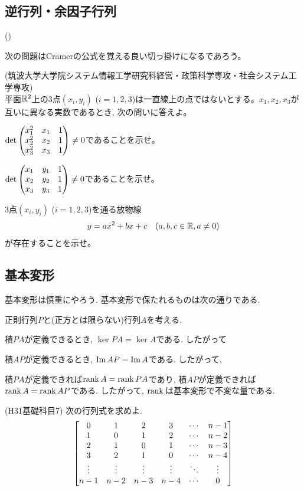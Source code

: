 \subsection{逆行列・余因子行列}

\begin{prop} ()

\end{prop}
次の問題はCramerの公式を覚える良い切っ掛けになるであろう。
\begin{prob}(筑波大学大学院システム情報工学研究科経営・政策科学専攻・社会システム工学専攻)\\
平面$\mathbb{R}^2$上の3点$(x_i,y_i)$ ($i=1,2,3$)は一直線上の点ではないとする。$x_1,x_2,x_3$が互いに異なる実数であるとき, 次の問いに答えよ。
\ben
\item $\det{\begin{pmatrix}x_1^2 & x_1 & 1\\ x_2^2 & x_2 & 1\\ x_3^2 & x_3 & 1 \end{pmatrix}} \neq 0$であることを示せ。
\item $\det{\begin{pmatrix}x_1 & y_1 & 1\\ x_2 & y_2 & 1\\ x_3 & y_3 & 1 \end{pmatrix}} \neq 0$であることを示せ。
\item 3点$(x_i,y_i)$ ($i=1,2,3$)を通る放物線
\[y=ax^2+bx+c\quad (a,b,c\in \mathbb{R}, a\neq 0)\]
が存在することを示せ。
\een
\end{prob}

\newpage
\subsection{基本変形}
基本変形は慎重にやろう. 基本変形で保たれるものは次の通りである.
\begin{prop} 正則行列$P$と(正方とは限らない)行列$A$を考える.
\ben
\item 積$PA$が定義できるとき, $\ker{PA} = \ker{A}$である. したがって
\item 積$AP$が定義できるとき, $\mathrm{Im}\,AP = \mathrm{Im}\,A$である. したがって, 
\item 積$PA$が定義できれば$\mathrm{rank}\, A = \mathrm{rank}\, PA$であり, 積$AP$が定義できれば$\mathrm{rank}\, A = \mathrm{rank}\, AP$である. したがって, $\rank$は基本変形で不変な量である.
\een
\end{prop}






\begin{egprob} (H31基礎科目7) \label{prob:H31kiso7}
次の行列式を求めよ.
\[
\begin{bmatrix}
0 & 1 & 2 & 3 & \cdots & n-1 \\
1 & 0 & 1 & 2 & \cdots & n-2 \\
2 & 1 & 0 & 1 & \cdots & n-3 \\
3 & 2 & 1 & 0 & \cdots & n-4 \\
\vdots & \vdots & \vdots & \vdots & \ddots & \vdots \\
n-1 & n-2 & n-3 & n-4 & \cdots & 0
\end{bmatrix}
\]
\end{egprob}

